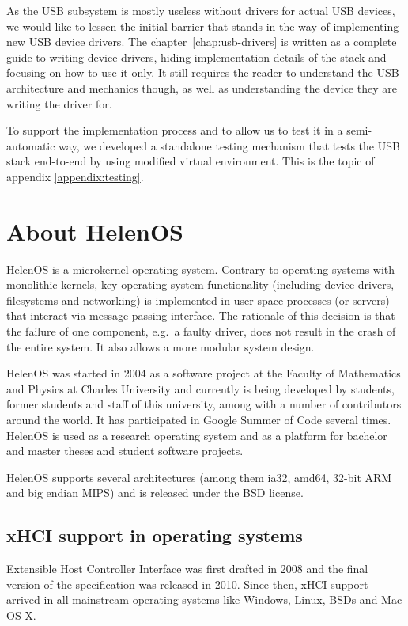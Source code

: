 As the USB subsystem is mostly useless without drivers for actual USB devices,
we would like to lessen the initial barrier that stands in the way of
implementing new USB device drivers. The chapter~\ref{chap:usb-drivers} is
written as a complete guide to writing device drivers, hiding implementation
details of the stack and focusing on how to use it only. It still requires the
reader to understand the USB architecture and mechanics though, as well as
understanding the device they are writing the driver for.

To support the implementation process and to allow us to test it in
a semi-automatic way, we developed a standalone testing mechanism that tests
the USB stack end-to-end by using modified virtual environment. This is the
topic of appendix \ref{appendix:testing}.

\section{About HelenOS}
HelenOS is a microkernel operating system. Contrary to operating systems with
monolithic kernels, key operating system functionality (including device
drivers, filesystems and networking) is implemented in user-space processes (or
servers) that interact via message passing interface. The rationale of this
decision is that the failure of one component, e.g.\ a faulty driver, does not
result in the crash of the entire system. It also allows a more modular system
design.

HelenOS was started in 2004 as a software project at the Faculty of Mathematics
and Physics at Charles University and currently is being developed by students,
former students and staff of this university, among with a number of
contributors around the world. It has participated in Google Summer of Code
several times. HelenOS is used as a research operating system and as a platform
for bachelor and master theses and student software projects.

HelenOS supports several architectures (among them ia32, amd64, 32-bit ARM and
big endian MIPS) and is released under the BSD license.

\subsection{xHCI support in operating systems}
\label{subsect:support-in-oses}

Extensible Host Controller Interface was first drafted in 2008 and the final
version of the specification was released in 2010. Since then, xHCI support
arrived in all mainstream operating systems like Windows, Linux, BSDs and Mac
OS X.

